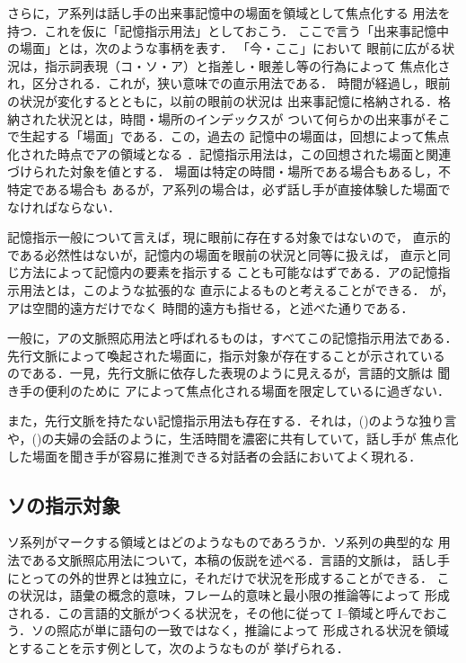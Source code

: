 さらに，ア系列は話し手の出来事記憶中の場面を領域として焦点化する
用法を持つ．これを仮に「記憶指示用法」としておこう．
ここで言う「出来事記憶中の場面」とは，次のような事柄を表す．
「今・ここ」において
眼前に広がる状況は，指示詞表現（コ・ソ・ア）と指差し・眼差し等の行為によって
焦点化され，区分される．これが，狭い意味での直示用法である．
時間が経過し，眼前の状況が変化するとともに，以前の眼前の状況は
出来事記憶に格納される．格納された状況とは，時間・場所のインデックスが
ついて何らかの出来事がそこで生起する「場面」である．この，過去の
記憶中の場面は，回想によって焦点化された時点でアの領域となる
．記憶指示用法は，この回想された場面と関連づけられた対象を値とする．
場面は特定の時間・場所である場合もあるし，不特定である場合も
あるが，ア系列の場合は，必ず話し手が直接体験した場面でなければならない．

記憶指示一般について言えば，現に眼前に存在する対象ではないので，
直示的である必然性はないが，記憶内の場面を眼前の状況と同等に扱えば，
直示と同じ方法によって記憶内の要素を指示する
ことも可能なはずである．アの記憶指示用法とは，このような拡張的な
直示によるものと考えることができる．
が，アは空間的遠方だけでなく
時間的遠方も指せる，と述べた通りである．

一般に，アの文脈照応用法と呼ばれるものは，すべてこの記憶指示用法である．
先行文脈によって喚起された場面に，指示対象が存在することが示されている
のである．一見，先行文脈に依存した表現のように見えるが，言語的文脈は
聞き手の便利のために
アによって焦点化される場面を限定しているに過ぎない．


また，先行文脈を持たない記憶指示用法も存在する．それは，()のような独り言
や，()の夫婦の会話のように，生活時間を濃密に共有していて，話し手が
焦点化した場面を聞き手が容易に推測できる対話者の会話においてよく現れる．



\subsection{ソの指示対象}
ソ系列がマークする領域とはどのようなものであろうか．ソ系列の典型的な
用法である文脈照応用法について，本稿の仮説を述べる．言語的文脈は，
話し手にとっての外的世界とは独立に，それだけで状況を形成することができる．
この状況は，語彙の概念的意味，フレーム的意味と最小限の推論等によって
形成される．この言語的文脈がつくる状況を，その他に従って
I--領域と呼んでおこう．ソの照応が単に語句の一致ではなく，推論によって
形成される状況を領域とすることを示す例として，次のようなものが
挙げられる．

